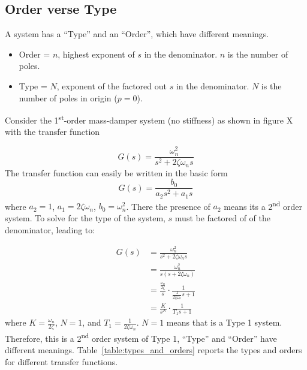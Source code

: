 \documentclass[12pt,letter]{article}
\numberwithin{ex}{section} %
\numberwithin{re}{section} %
\newcommand{\rd}[1]{\textcolor[rgb]{0.75,0.00,0.00}{#1}}
\numberwithin{equation}{section}	%
\begin{document}
\subsection{Order verse Type}


A system has a ``Type'' and an ``Order'', which have different meanings. 
\begin{itemize}[noitemsep,topsep=0pt]
\item Order = $n$, highest exponent of $s$ in the denominator. $n$ is the number of poles.
\item Type = $N$, exponent of the factored out $s$ in the denominator. $N$ is the number of poles in origin ($p=0$). 
\end{itemize}

Consider the 1\textsuperscript{st}-order mass-damper system (no stiffness) as shown in figure \rd{X} with the transfer function


\begin{equation}
G(s) = \frac{\omega_n^2}{s^2 + 2 \zeta \omega_n s} 
\end{equation}
The transfer function can easily be written in the basic form 
\begin{equation}
G(s) = \frac{b_0}{a_2s^2+a_1s}
\end{equation}
where $a_2=1$, $a_1=2 \zeta \omega_n$, $b_0 = \omega_n^2$. There the presence of $a_2$ means its a 2\textsuperscript{nd} order system. To solve for the type of the system, $s$ must be factored of of the denominator, leading to:

\begin{align}
G(s) &= \frac{\omega_n^2}{s^2 + 2 \zeta \omega_n s} \\
&= \frac{\omega_n^2}{s(s+2 \zeta \omega_n)} \nonumber \\
&= \frac{\frac{\omega_n}{2 \zeta}}{s} \cdot \frac{1}{\frac{1}{2 \zeta \omega_n}s+1} \nonumber \\
&= \frac{K}{s^N} \cdot \frac{1}{T_1s+1} \nonumber
\end{align}
where $K=\frac{\omega_n}{2 \zeta}$, $N=1$, and $T_1 = \frac{1}{2 \zeta \omega_n}$. $N=1$ means that is a Type 1 system. Therefore, this is a 2\textsuperscript{nd} order system of Type 1, ``Type'' and ``Order'' have different meanings. Table~\ref{table:types_and_orders} reports the types and orders for different transfer functions.
\end{document}
